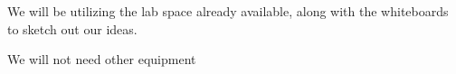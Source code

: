 We will be utilizing the lab space already available, along with the whiteboards to sketch out our ideas.

We will not need other equipment
